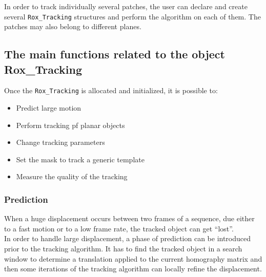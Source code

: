 
In order to track individually several patches, the user can declare and create
several \lstinline$Rox_Tracking$ structures and perform the algorithm on each of
them. The patches may also belong to different planes.\\


\subsection{The main functions related to the object Rox\_Tracking}
\label{sss:tracking_methods}

Once the \lstinline$Rox_Tracking$ is allocated and initialized, it is possible to:
\begin{itemize}
  \item Predict large motion
  \item Perform tracking pf planar objects
  \item Change tracking parameters
  \item Set the mask to track a generic template
  \item Measure the quality of the tracking
\end{itemize}


\subsubsection{Prediction}
\label{sse:prediction}


When a huge displacement occurs
between two frames of a sequence, due either to a fast motion or to a
low frame rate, the tracked object can get ``lost''.\\

In order to handle large displacement,
a phase of prediction can be introduced prior to the tracking
algorithm. It has to find the tracked object in a search window to
determine a translation applied to the current homography matrix and
then some iterations of the tracking algorithm can locally refine
the displacement.\\

